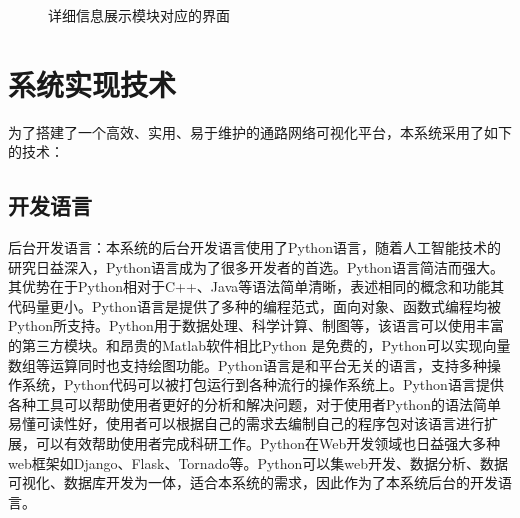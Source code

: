 \begin{figure}[h]{\label{juti}}
\begin{minipage}{1.0\linewidth}
\begin{minipage}{\textwidth}
      \subfigure{\label{j5}}\addtocounter{subfigure}{-2}
      \subfigure{\label{j6}}\addtocounter{subfigure}{-2}
    \end{minipage}
	\caption[juti]{详细信息展示模块对应的界面}
	\label{juti}
  \end{minipage}
\end{figure}



\section{系统实现技术}
为了搭建了一个高效、实用、易于维护的通路网络可视化平台，本系统采用了如下的技术：

\subsection{开发语言}
后台开发语言：本系统的后台开发语言使用了Python语言，随着人工智能技术的研究日益深入，Python语言成为了很多开发者的首选。Python语言简洁而强大。其优势在于Python相对于C++、Java等语法简单清晰，表述相同的概念和功能其代码量更小。Python语言是提供了多种的编程范式，面向对象、函数式编程均被Python所支持。Python用于数据处理、科学计算、制图等，该语言可以使用丰富的第三方模块。和昂贵的Matlab软件相比Python 是免费的，Python可以实现向量数组等运算同时也支持绘图功能。Python语言是和平台无关的语言，支持多种操作系统，Python代码可以被打包运行到各种流行的操作系统上。Python语言提供各种工具可以帮助使用者更好的分析和解决问题，对于使用者Python的语法简单易懂可读性好，使用者可以根据自己的需求去编制自己的程序包对该语言进行扩展，可以有效帮助使用者完成科研工作。Python在Web开发领域也日益强大多种web框架如Django、Flask、Tornado等。Python可以集web开发、数据分析、数据可视化、数据库开发为一体，适合本系统的需求，因此作为了本系统后台的开发语言。

